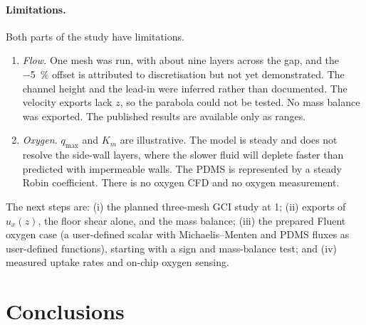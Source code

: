 \documentclass[11pt,a4paper]{article}
\newcommand{\qmax}{q_{\max}}
\newcommand{\Km}{K_{m}}
\begin{document}
\paragraph{Limitations.} Both parts of the study have limitations.
\begin{enumerate}
\item \emph{Flow.} One mesh was run, with about nine layers across the gap, and the \SI{-5}{\percent} offset is attributed to discretisation but not yet demonstrated. The channel height and the lead-in were inferred rather than documented. The velocity exports lack $z$, so the parabola could not be tested. No mass balance was exported. The published results are available only as ranges.
\item \emph{Oxygen.} $\qmax$ and $\Km$ are illustrative. The model is steady and does not resolve the side-wall layers, where the slower fluid will deplete faster than predicted with impermeable walls. The PDMS is represented by a steady Robin coefficient. There is no oxygen CFD and no oxygen measurement.
\end{enumerate}
The next steps are: (i) the planned three-mesh GCI study at \SI{1}{\uLmin}; (ii) exports of $u_x(z)$, the floor shear alone, and the mass balance; (iii) the prepared Fluent oxygen case (a user-defined scalar with Michaelis--Menten and PDMS fluxes as user-defined functions), starting with a sign and mass-balance test; and (iv) measured uptake rates and on-chip oxygen sensing.

\section{Conclusions}
\end{document}
